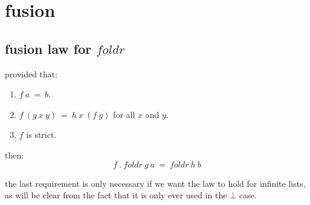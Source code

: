 \documentclass[twoside]{article}
\begin{document}
\section{fusion} %
\subsection{fusion law for $foldr$}
provided that:
\begin{enumerate}
  \item $f~a~=~b$.
  \item $f~(g~x~y)~=~h~x~(f~y)$ for all $x$ and $y$.
  \item $f$ is strict.
\end{enumerate}
then:
$$f~.~foldr~g~a~=~foldr~h~b$$

the last requirement is only necessary if we want the law to hold for infinite
lists, as will be clear from the fact that it is only ever used in the $\bot$
case.
\end{document}

